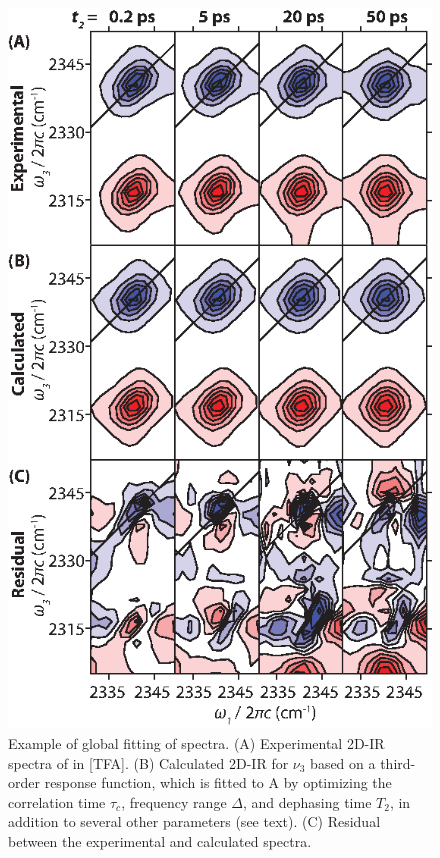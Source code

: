 \documentclass[%
  class = book,%
  crop = false,%
  float = true,%
  multi = true,%
  preview = false,%
]{standalone}
\begin{document}
{\begin{figure}
  \centering
  \includegraphics[scale=1.25]{fig8.eps}
  \caption[Example of global fitting of 2D-IR spectra]{\label{fig:TFA 2D fit}Example of global fitting of spectra. (A) Experimental 2D-IR spectra of  in \ce{[Im_{4,1}]}[TFA]. (B) Calculated 2D-IR for \(\nu_3\) based on a third-order response function, which is fitted to A by optimizing the correlation time \(\tau_c\), frequency range \(\Delta\), and dephasing time \(T_2\), in addition to several other parameters (see text). (C) Residual between the experimental and calculated spectra.}
\end{figure}

}
\end{document}
